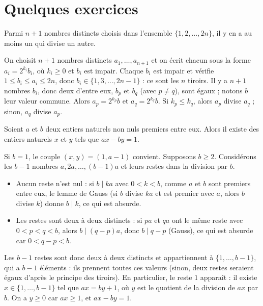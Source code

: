 \section*{Quelques exercices}
\begin{exercise}
    Parmi \( n+1 \) nombres distincts choisis dans l'ensemble \( \{1, 2, \ldots, 2n\} \), il y en a au moins un qui divise un autre.

    \begin{solution}
        On choisit \( n+1 \) nombres distincts \( a_1, \ldots, a_{n+1} \) et on écrit chacun sous la forme \( a_i = 2^{k_i} b_i \), où \( k_i \geq 0 \) et \( b_i \) est impair.
        Chaque \( b_i \) est impair et vérifie \( 1 \leq b_i \leq a_i \leq 2n \), donc \( b_i \in \{1, 3, \ldots, 2n-1\} \) : ce sont les \( n \) tiroirs.
        Il y a \( n+1 \) nombres \( b_i \), donc deux d'entre eux, \( b_p \) et \( b_q \) (avec \( p \neq q \)), sont égaux ; notons \( b \) leur valeur commune.
        Alors \( a_p = 2^{k_p} b \) et \( a_q = 2^{k_q} b \). Si \( k_p \leq k_q \), alors \( a_p \) divise \( a_q \) ; sinon, \( a_q \) divise \( a_p \).
    \end{solution}
\end{exercise}

\begin{exercise}
    Soient \( a \) et \( b \) deux entiers naturels non nuls premiers entre eux.
    Alors il existe des entiers naturels \( x \) et \( y \) tels que \( ax - by = 1 \).

    \begin{solution}
        Si \( b = 1 \), le couple \( (x,y) = (1, a-1) \) convient. Supposons \( b \geq 2 \).
        Considérons les \( b-1 \) nombres \( a, 2a, \ldots, (b-1)a \) et leurs restes dans la division par \( b \).
        \begin{itemize}
            \item Aucun reste n'est nul : si \( b \mid ka \) avec \( 0 < k < b \), comme \( a \) et \( b \) sont premiers entre eux, le lemme de Gauss (si \( b \) divise \( ka \) et est premier avec \( a \), alors \( b \) divise \( k \)) donne \( b \mid k \), ce qui est absurde.
            \item Les restes sont deux à deux distincts : si \( pa \) et \( qa \) ont le même reste avec \( 0 < p < q < b \), alors \( b \mid (q-p)a \), donc \( b \mid q-p \) (Gauss), ce qui est absurde car \( 0 < q-p < b \).
        \end{itemize}
        Les \( b-1 \) restes sont donc deux à deux distincts et appartiennent à \( \{1, \ldots, b-1\} \), qui a \( b-1 \) éléments : ils prennent toutes ces valeurs (sinon, deux restes seraient égaux d'après le principe des tiroirs). En particulier, le reste \( 1 \) apparaît : il existe \( x \in \{1, \ldots, b-1\} \) tel que \( ax = by + 1 \), où \( y \) est le quotient de la division de \( ax \) par \( b \). On a \( y \geq 0 \) car \( ax \geq 1 \), et \( ax - by = 1 \).
    \end{solution}
\end{exercise}


